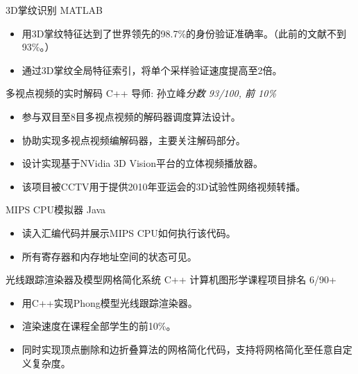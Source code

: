 \documentclass[11pt,a4paper]{moderncv/moderncv}
\begin{document}
{3D掌纹识别}
{MATLAB}
{}{}
{
\begin{itemize}
	\item 用3D掌纹特征达到了世界领先的98.7\%的身份验证准确率。（此前的文献不到93\%。）
	\item 通过3D掌纹全局特征索引，将单个采样验证速度提高至2倍。
\end{itemize}
}

{多视点视频的实时解码}
{C++}
{导师: 孙立峰}{\textit{分数 93/100, 前 10\%}}
{
\begin{itemize}
	\item 参与双目至8目多视点视频的解码器调度算法设计。
	\item 协助实现多视点视频编解码器，主要关注解码部分。
	\item 设计实现基于NVidia 3D Vision平台的立体视频播放器。
	\item 该项目被CCTV用于提供2010年亚运会的3D试验性网络视频转播。
\end{itemize}
}

{MIPS CPU模拟器}
{Java}
{}{}
{
\begin{itemize}
	\item 读入汇编代码并展示MIPS CPU如何执行该代码。
	\item 所有寄存器和内存地址空间的状态可见。
\end{itemize}
}


{光线跟踪渲染器及模型网格简化系统}
{C++}
{计算机图形学课程项目}{排名 6/90+}
{
\begin{itemize}
	\item 用C++实现Phong模型光线跟踪渲染器。
	\item 渲染速度在课程全部学生的前10\%。
	\item 同时实现顶点删除和边折叠算法的网格简化代码，支持将网格简化至任意自定义复杂度。
\end{itemize}
}
\end{document}
